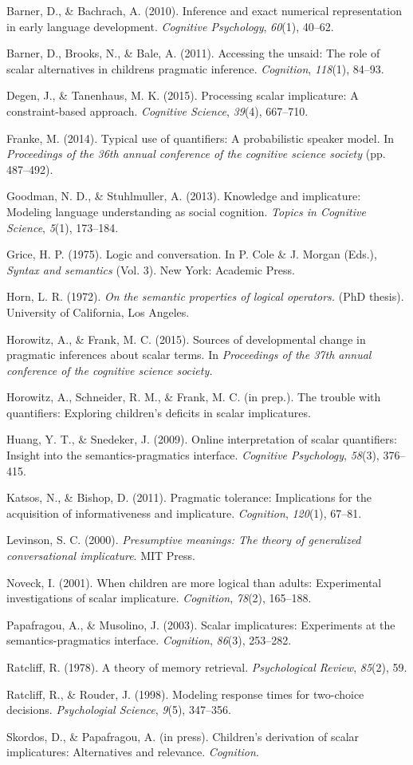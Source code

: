 \documentclass[10pt, letterpaper]{article}
\begin{document}
\setlength{\parindent}{-0.1in} \setlength{\leftskip}{0.125in} \noindent

Barner, D., \& Bachrach, A. (2010). Inference and exact numerical
representation in early language development. \emph{Cognitive
Psychology}, \emph{60}(1), 40--62.

Barner, D., Brooks, N., \& Bale, A. (2011). Accessing the unsaid: The
role of scalar alternatives in childrens pragmatic inference.
\emph{Cognition}, \emph{118}(1), 84--93.

Degen, J., \& Tanenhaus, M. K. (2015). Processing scalar implicature: A
constraint-based approach. \emph{Cognitive Science}, \emph{39}(4),
667--710.

Franke, M. (2014). Typical use of quantifiers: A probabilistic speaker
model. In \emph{Proceedings of the 36th annual conference of the
cognitive science society} (pp. 487--492).

Goodman, N. D., \& Stuhlmuller, A. (2013). Knowledge and implicature:
Modeling language understanding as social cognition. \emph{Topics in
Cognitive Science}, \emph{5}(1), 173--184.

Grice, H. P. (1975). Logic and conversation. In P. Cole \& J. Morgan
(Eds.), \emph{Syntax and semantics} (Vol. 3). New York: Academic Press.

Horn, L. R. (1972). \emph{On the semantic properties of logical
operators.} (PhD thesis). University of California, Los Angeles.

Horowitz, A., \& Frank, M. C. (2015). Sources of developmental change in
pragmatic inferences about scalar terms. In \emph{Proceedings of the
37th annual conference of the cognitive science society.}

Horowitz, A., Schneider, R. M., \& Frank, M. C. (in prep.). The trouble
with quantifiers: Exploring children's deficits in scalar implicatures.

Huang, Y. T., \& Snedeker, J. (2009). Online interpretation of scalar
quantifiers: Insight into the semantics-pragmatics interface.
\emph{Cognitive Psychology}, \emph{58}(3), 376--415.

Katsos, N., \& Bishop, D. (2011). Pragmatic tolerance: Implications for
the acquisition of informativeness and implicature. \emph{Cognition},
\emph{120}(1), 67--81.

Levinson, S. C. (2000). \emph{Presumptive meanings: The theory of
generalized conversational implicature}. MIT Press.

Noveck, I. (2001). When children are more logical than adults:
Experimental investigations of scalar implicature. \emph{Cognition},
\emph{78}(2), 165--188.

Papafragou, A., \& Musolino, J. (2003). Scalar implicatures: Experiments
at the semantics-pragmatics interface. \emph{Cognition}, \emph{86}(3),
253--282.

Ratcliff, R. (1978). A theory of memory retrieval. \emph{Psychological
Review}, \emph{85}(2), 59.

Ratcliff, R., \& Rouder, J. (1998). Modeling response times for
two-choice decisions. \emph{Psychologial Science}, \emph{9}(5),
347--356.

Skordos, D., \& Papafragou, A. (in press). Children's derivation of
scalar implicatures: Alternatives and relevance. \emph{Cognition}.
\end{document}
